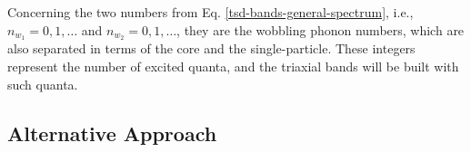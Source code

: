 Concerning the two numbers from Eq. \ref{tsd-bands-general-spectrum}, i.e., $n_{w_1}=0,1,\dots$ and $n_{w_2}=0,1,\dots$, they are the wobbling phonon numbers, which are also separated in terms of the core and the single-particle. These integers represent the number of excited quanta, and the triaxial bands will be built with such quanta. 

\subsection{Alternative Approach}
\label{Omega-1-2-alternative-method}

